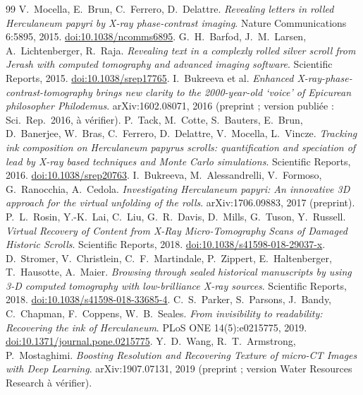 \documentclass[11pt,a4paper]{article}
\begin{document}
\begin{thebibliography}{99}
\small
{} V.~Mocella, E.~Brun, C.~Ferrero, D.~Delattre. \emph{Revealing letters in rolled Herculaneum papyri by X-ray phase-contrast imaging}. Nature Communications 6:5895, 2015. \href{https://doi.org/10.1038/ncomms6895}{doi:10.1038/ncomms6895}.
 G.~H.~Barfod, J.~M.~Larsen, A.~Lichtenberger, R.~Raja. \emph{Revealing text in a complexly rolled silver scroll from Jerash with computed tomography and advanced imaging software}. Scientific Reports, 2015. \href{https://doi.org/10.1038/srep17765}{doi:10.1038/srep17765}.
 I.~Bukreeva et al. \emph{Enhanced X-ray-phase-contrast-tomography brings new clarity to the 2000-year-old `voice' of Epicurean philosopher Philodemus}. arXiv:1602.08071, 2016 (preprint ; version publiée : Sci.~Rep.~2016, à vérifier).
 P.~Tack, M.~Cotte, S.~Bauters, E.~Brun, D.~Banerjee, W.~Bras, C.~Ferrero, D.~Delattre, V.~Mocella, L.~Vincze. \emph{Tracking ink composition on Herculaneum papyrus scrolls: quantification and speciation of lead by X-ray based techniques and Monte Carlo simulations}. Scientific Reports, 2016. \href{https://doi.org/10.1038/srep20763}{doi:10.1038/srep20763}.
 I.~Bukreeva, M.~Alessandrelli, V.~Formoso, G.~Ranocchia, A.~Cedola. \emph{Investigating Herculaneum papyri: An innovative 3D approach for the virtual unfolding of the rolls}. arXiv:1706.09883, 2017 (preprint).
 P.~L.~Rosin, Y.-K.~Lai, C.~Liu, G.~R.~Davis, D.~Mills, G.~Tuson, Y.~Russell. \emph{Virtual Recovery of Content from X-Ray Micro-Tomography Scans of Damaged Historic Scrolls}. Scientific Reports, 2018. \href{https://doi.org/10.1038/s41598-018-29037-x}{doi:10.1038/s41598-018-29037-x}.
 D.~Stromer, V.~Christlein, C.~F.~Martindale, P.~Zippert, E.~Haltenberger, T.~Hausotte, A.~Maier. \emph{Browsing through sealed historical manuscripts by using 3-D computed tomography with low-brilliance X-ray sources}. Scientific Reports, 2018. \href{https://doi.org/10.1038/s41598-018-33685-4}{doi:10.1038/s41598-018-33685-4}.
 C.~S.~Parker, S.~Parsons, J.~Bandy, C.~Chapman, F.~Coppens, W.~B.~Seales. \emph{From invisibility to readability: Recovering the ink of Herculaneum}. PLoS ONE 14(5):e0215775, 2019. \href{https://doi.org/10.1371/journal.pone.0215775}{doi:10.1371/journal.pone.0215775}.
 Y.~D.~Wang, R.~T.~Armstrong, P.~Mostaghimi. \emph{Boosting Resolution and Recovering Texture of micro-CT Images with Deep Learning}. arXiv:1907.07131, 2019 (preprint ; version Water Resources Research à vérifier).

\end{thebibliography}
\end{document}
